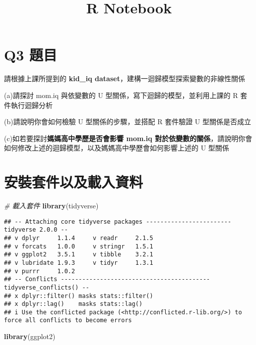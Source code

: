 \documentclass[
]{article}
\title{R Notebook}
\author{}
\date{\vspace{-2.5em}}
\newenvironment{Shaded}{\begin{snugshade}}{\end{snugshade}}
\newcommand{\CommentTok}[1]{\textcolor[rgb]{0.56,0.35,0.01}{\textit{#1}}}
\newcommand{\FunctionTok}[1]{\textcolor[rgb]{0.13,0.29,0.53}{\textbf{#1}}}
\newcommand{\NormalTok}[1]{#1}
\begin{document}
\maketitle

\section{Q3 題目}\label{q3-ux984cux76ee}

請根據上課所提到的 \textbf{kid\_iq
dataset}，建構一迴歸模型探索變數的非線性關係

(a)請探討 mom.iq 與依變數的 U 型關係，寫下迴歸的模型，並利用上課的 R
套件執行迴歸分析

(b)請說明你會如何檢驗 U 型關係的步驟，並搭配 R 套件驗證 U 型關係是否成立

(c)如若要探討\textbf{媽媽高中學歷是否會影響 mom.iq
對於依變數的關係}，請說明你會如何修改上述的迴歸模型，以及媽媽高中學歷會如何影響上述的
U 型關係

\section{安裝套件以及載入資料}\label{ux5b89ux88ddux5957ux4ef6ux4ee5ux53caux8f09ux5165ux8cc7ux6599}

\begin{Shaded}
\begin{Highlighting}[]
\CommentTok{\# 載入套件}
\FunctionTok{library}\NormalTok{(tidyverse)}
\end{Highlighting}
\end{Shaded}

\begin{verbatim}
## -- Attaching core tidyverse packages ------------------------ tidyverse 2.0.0 --
## v dplyr     1.1.4     v readr     2.1.5
## v forcats   1.0.0     v stringr   1.5.1
## v ggplot2   3.5.1     v tibble    3.2.1
## v lubridate 1.9.3     v tidyr     1.3.1
## v purrr     1.0.2     
## -- Conflicts ------------------------------------------ tidyverse_conflicts() --
## x dplyr::filter() masks stats::filter()
## x dplyr::lag()    masks stats::lag()
## i Use the conflicted package (<http://conflicted.r-lib.org/>) to force all conflicts to become errors
\end{verbatim}

\begin{Shaded}
\begin{Highlighting}[]
\FunctionTok{library}\NormalTok{(ggplot2)}
\end{Highlighting}
\end{Shaded}
\end{document}
